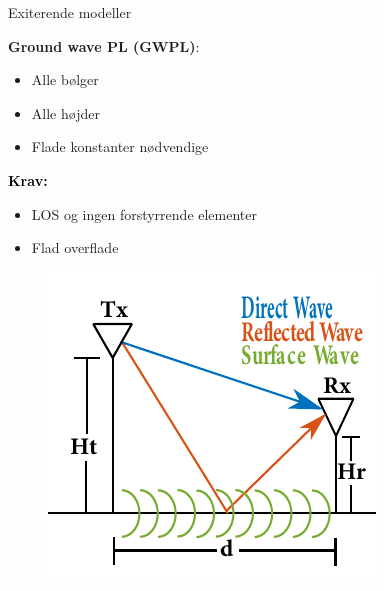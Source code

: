 \begin{frame}{Exiterende modeller}
\begin{minipage}{.45\textwidth}
\raggedright\textcolor{thomaspurple}{\textbf{Ground wave PL (GWPL)}:}
\begin{itemize}
\item Alle bølger
\item Alle højder
\item Flade konstanter nødvendige
\end{itemize} 

\vspace{1em}
\textcolor{black}{\textbf{Krav:}}
\begin{itemize}
\item LOS og ingen forstyrrende elementer
\item Flad overflade
\end{itemize}

\end{minipage}
\begin{minipage}{0.5\textwidth}
\begin{figure}[!htbp]
 \centering
  \includegraphics[width = \columnwidth]{figures/poster_cropped_1.pdf}
  \end{figure}
\end{minipage}


\end{frame}
